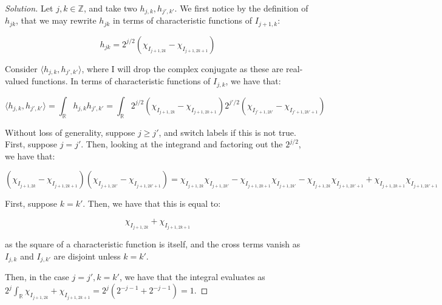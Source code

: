 \documentclass[10pt]{article}
\begin{document}
\begin{proof}[Solution]


Let $j, k \in\mathbb{Z}$, and take two $h_{j,k}, h_{j', k'}$. We first notice by the definition of $h_{jk}$, that we may rewrite $h_{jk}$ in terms of characteristic functions of $I_{j+1, k}$:

$$ h_{jk} = 2^{j/2} (\chi_{I_{j+1, 2k}} - \chi_{I_{j+1, 2k+1}} ) $$


Consider $\langle h_{j,k}, h_{j', k'} \rangle$, where I will drop the complex conjugate as these are real-valued functions. In terms of characteristic functions of $I_{j,k}$, we have that:

$$  \langle h_{j,k}, h_{j', k'} \rangle = \int_{\mathbb{R}}  h_{j,k}  h_{j', k'} = \int_{\mathbb{R}}  2^{j/2} (\chi_{I_{j+1, 2k}} - \chi_{I_{j+1, 2k+1}} ) 2^{j'/2} (\chi_{I_{j'+1, 2k'}} - \chi_{I_{j'+1, 2k'+1}} )$$

Without loss of generality, suppose $j \geq j'$, and switch labels if this is not true. First, suppose $j = j'$. Then, looking at the integrand and factoring out the $2^{j/2}$, we have that:

$$  (\chi_{I_{j+1, 2k}} - \chi_{I_{j+1, 2k+1}} )  (\chi_{I_{j+1, 2k'}} - \chi_{I_{j+1, 2k'+1}} ) = \chi_{I_{j+1, 2k}}\chi_{I_{j+1, 2k'}} - \chi_{I_{j+1, 2k+1}}\chi_{I_{j+1, 2k'}} - \chi_{I_{j+1, 2k}}\chi_{I_{j+1, 2k'+1}} + \chi_{I_{j+1, 2k+1}} \chi_{I_{j+1, 2k'+1}}  $$

First, suppose $k = k'$. Then, we have that this is equal to:

$$ \chi_{I_{j+1, 2k}} +  \chi_{I_{j+1, 2k+1}} $$

as the square of a characteristic function is itself, and the cross terms vanish as $I_{j,k}$ and $I_{j, k'}$ are disjoint unless $k = k'$.

Then, in the case $j = j', k = k'$, we have that the integral evaluates as $2^j \int_{\mathbb{R}}  \chi_{I_{j+1, 2k}} +  \chi_{I_{j+1, 2k+1}} = 2^j( 2^{-j-1} + 2^{ -j -1} ) =  1$.


\end{proof}
\end{document}
